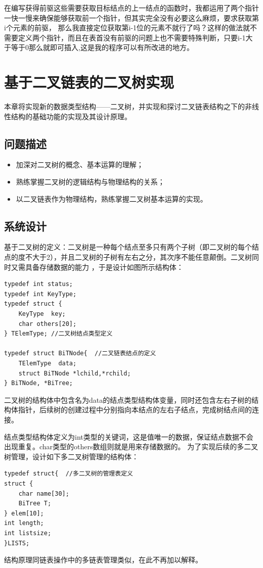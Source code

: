 \documentclass[supercite]{Experimental_Report}
\theoremstyle{definition}
\begin{document}
在编写获得前驱这些需要获取目标结点的上一结点的函数时，我都运用了两个指针一快一慢来确保能够获取前一个指针，但其实完全没有必要这么麻烦，要求获取第i个元素的前驱，
那么我直接定位获取第i-1位的元素不就行了吗？这样的做法就不需要定义两个指针，而且在表首没有前驱的问题上也不需要特殊判断，只要i-1大于等于0那么就即可插入,这是我的程序可以有所改进的地方。


\newpage

\section{基于二叉链表的二叉树实现}
本章将实现新的数据类型结构——二叉树，并实现和探讨二叉链表结构之下的非线性结构的基础功能的实现及其设计原理。

\subsection{问题描述}
\begin{itemize}
	\item 加深对二叉树的概念、基本运算的理解；
	\item 熟练掌握二叉树的逻辑结构与物理结构的关系；
	\item 以二叉链表作为物理结构，熟练掌握二叉树基本运算的实现。
\end{itemize}

\subsection{系统设计}
基于二叉树的定义：二叉树是一种每个结点至多只有两个子树（即二叉树的每个结点的度不大于2），并且二叉树的子树有左右之分，其次序不能任意颠倒。二叉树同时又需具备存储数据的能力
，于是设计如图所示结构体：
\begin{center}
	\label{lst-2}
\end{center}
\begin{lstlisting}
typedef int status;
typedef int KeyType; 
typedef struct {
	KeyType  key;
	char others[20];
} TElemType; //二叉树结点类型定义

typedef struct BiTNode{  //二叉链表结点的定义
	TElemType  data;
	struct BiTNode *lchild,*rchild;
} BiTNode, *BiTree;
\end{lstlisting}
二叉树的结构体中包含名为data的结点类型结构体变量，同时还包含左右子树的结构体指针，后续树的创建过程中分别指向本结点的左右子结点，完成树结点间的连接。

结点类型结构体定义为int类型的关键词，这是值唯一的数据，保证结点数据不会出现重复。char类型的others数组则就是用来存储数据的。
为了实现后续的多二叉树管理，设计如下多二叉树管理的结构体：
\begin{center}
	\label{lst-3}
\end{center}
\begin{lstlisting}
typedef struct{  //多二叉树的管理表定义
struct { 
	char name[30];
	BiTree T;	
} elem[10];
int length;
int listsize;
}LISTS;
\end{lstlisting}
结构原理同链表操作中的多链表管理类似，在此不再加以解释。
\end{document}
